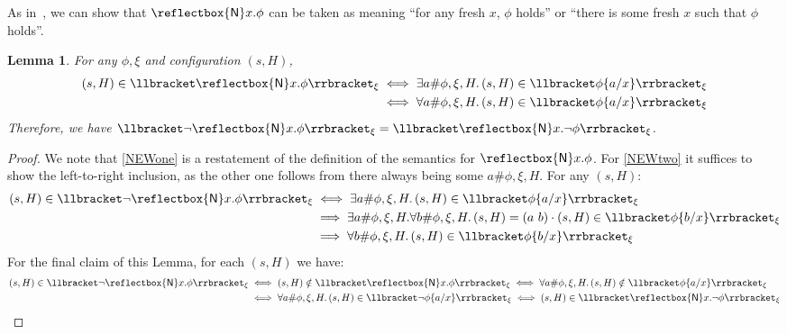 \documentclass[10pt,a4paper]{article}
\newtheorem{lemma}[theorem]{Lemma}
\theoremstyle{definition}
\theoremstyle{remark}
\newcommand\new[0]{\reflectbox{\ensuremath{\mathsf{N}}}}
\newcommand\fresh[1]{\new #1.}
\newcommand\sem[2][\xi]{\llbracket#2\rrbracket_{#1}}
\newcommand{\swp}[2]{(#1\ #2)}
\begin{document}
As in~\cite{PittsGabbay,Pitts}, we can show that $\fresh{x}\phi$ can be taken as meaning ``for any fresh $x$, $\phi$ holds'' or ``there is some fresh $x$ such that $\phi$ holds''. 

\begin{lemma}
  For any $\phi,\xi$ and configuration $(s,H)$,
  \begin{align}
    (s,H)\in\sem{\fresh{x}\phi} 
    \iff \exists a\#\phi,\xi,H.\,(s,H)\in\sem{\phi\{a/x\}}\label{NEWone}\\
\iff \forall a\#\phi,\xi,H.\,(s,H)\in\sem{\phi\{a/x\}}\label{NEWtwo}
  \end{align}
Therefore, we have $\sem{\lnot\fresh{x}\phi}=\sem{\fresh{x}\lnot\phi}$.
\end{lemma}
\begin{proof}
  We note that \eqref{NEWone} is a restatement of the definition of the semantics for $\fresh{x}\phi$. For \eqref{NEWtwo}
it suffices to show the left-to-right inclusion, as the other one follows from there always being some $a\#\phi,\xi,H$.
  For any $(s,H)$:
  \begin{align*}
(s,H)\in\sem{\lnot\fresh{x}\phi} &
\iff\exists a\#\phi,\xi,H.\,(s,H)\in\sem{\phi\{a/x\}}\\
&\implies\exists a\#\phi,\xi,H.\forall b\#\phi,\xi,H.\,(s,H)=\swp{a}{b}\cdot(s,H)\in\sem{\phi\{b/x\}}\\
 &\implies \forall b\#\phi,\xi,H.\,(s,H)\in\sem{\phi\{b/x\}}
  \end{align*}
  For the final claim of this Lemma, for each $(s,H)$ we have:
    \begin{align*}
    (s,H)\in\sem{\lnot\fresh{x}\phi} &
    \iff (s,H)\notin\sem{\fresh{x}\phi} 
\iff\forall a\#\phi,\xi,H.\,(s,H)\notin\sem{\phi\{a/x\}}\\
&\iff\forall a\#\phi,\xi,H.\,(s,H)\in\sem{\lnot\phi\{a/x\}}
\iff (s,H)\in\sem{\fresh{x}\lnot\phi}
  \end{align*}
\end{proof}
\end{document}
